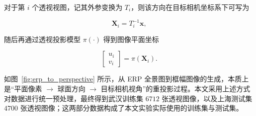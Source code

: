 对于第 $i$ 个透视视图，记其外参变换为 $T_i$，则该方向在目标相机坐标系下可写为

\begin{equation}
\mathbf{X}_i=T_i^{-1}\mathbf{x},
\end{equation}

随后再通过透视投影模型 $\pi(\cdot)$ 得到图像平面坐标

\begin{equation}
\begin{bmatrix}
u_i\\
v_i
\end{bmatrix}
=
\pi(\mathbf{X}_i).
\end{equation}

如图~\ref{fig:erp_to_perspective} 所示，从 ERP 全景图到框幅图像的生成，本质上是“平面像素 $\rightarrow$ 球面方向 $\rightarrow$ 目标相机视角”的重投影过程。本文采用上述方式对数据进行统一预处理，最终得到武汉训练集 $6712$ 张透视图像，以及上海测试集 $4700$ 张透视图像；这两部分数据构成了本文实验实际使用的训练集与测试集。

